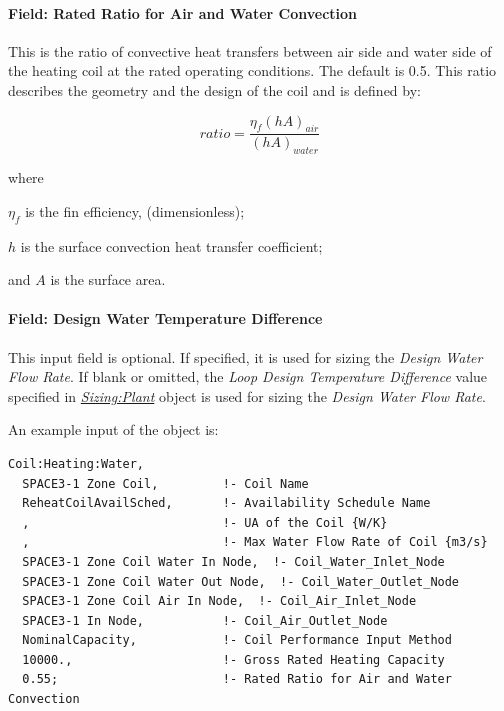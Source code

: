 \paragraph{Field: Rated Ratio for Air and Water Convection}\label{field-rated-ratio-for-air-and-water-convection}

This is the ratio of convective heat transfers between air side and water side of the heating coil at the rated operating conditions. The default is 0.5. This ratio describes the geometry and the design of the coil and is defined by:

\begin{equation}
ratio = \frac{{{\eta_f}{{\left( {hA} \right)}_{air}}}}{{{{\left( {hA} \right)}_{water}}}}
\end{equation}

where

$\eta_f$ is the fin efficiency, (dimensionless);

$h$ is the surface convection heat transfer coefficient;

and $A$ is the surface area.

\paragraph{Field: Design Water Temperature Difference}

This input field is optional. If specified, it is used for sizing the \textit{Design Water Flow Rate}. If blank or omitted, the \textit{Loop Design Temperature Difference} value specified in \textit{\hyperref[sizingplant]{Sizing:Plant}} object is used for sizing the \textit{Design Water Flow Rate}.

An example input of the object is:

\begin{lstlisting}
Coil:Heating:Water,
  SPACE3-1 Zone Coil,         !- Coil Name
  ReheatCoilAvailSched,       !- Availability Schedule Name
  ,                           !- UA of the Coil {W/K}
  ,                           !- Max Water Flow Rate of Coil {m3/s}
  SPACE3-1 Zone Coil Water In Node,  !- Coil_Water_Inlet_Node
  SPACE3-1 Zone Coil Water Out Node,  !- Coil_Water_Outlet_Node
  SPACE3-1 Zone Coil Air In Node,  !- Coil_Air_Inlet_Node
  SPACE3-1 In Node,           !- Coil_Air_Outlet_Node
  NominalCapacity,            !- Coil Performance Input Method
  10000.,                     !- Gross Rated Heating Capacity
  0.55;                       !- Rated Ratio for Air and Water Convection
\end{lstlisting}

